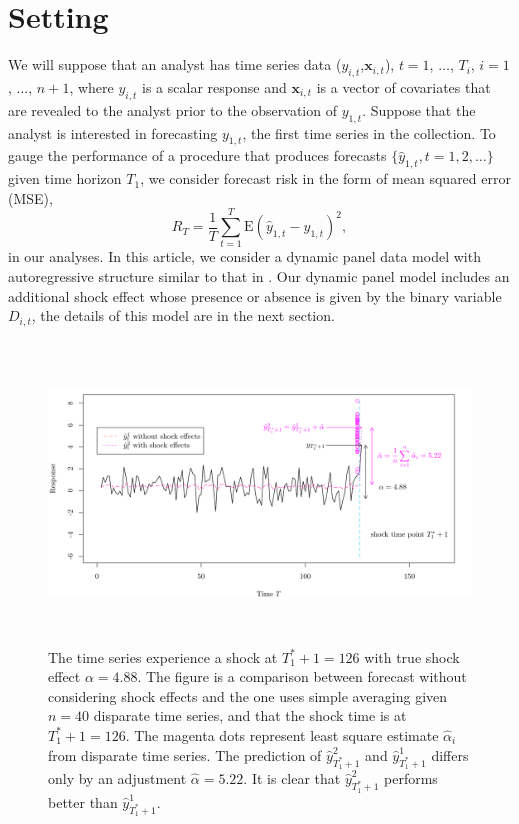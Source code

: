 \documentclass[11pt]{article}
\newcommand{\x}{\textbf{x}}
\def\E#1{\mathrm{E}(#1)} %
\theoremstyle{definition}
\begin{document}
\section{Setting}
\label{setting}



We will suppose that an analyst has time series data ($y_{i,t}$,$\x_{i,t}$), 
$t = 1$, $\ldots$, $T_i$, $i = 1$, $\ldots$, $n+1$, where $y_{i,t}$ is a 
scalar response and $\x_{i,t}$ is a vector of covariates that are revealed to 
the analyst prior to the observation of $y_{1,t}$.  Suppose that the analyst 
is interested in forecasting $y_{1,t}$, the first time series in the 
collection.
To gauge the performance of a procedure that produces forecasts 
$\{\hat y_{1,t}, t= 1,2,\ldots\}$ given time horizon $T_1$, 
we consider forecast risk in the form of  mean squared error (MSE),
$$
  R_T = \frac{1}{T}\sum_{t=1}^T\E{\hat y_{1,t} - y_{1,t}}^2,
$$
in our analyses. In this article, we consider a dynamic panel data 
model with autoregressive structure similar to that in \citet{blundell1998initial}. 
Our dynamic panel model includes an additional shock effect whose presence 
or absence is given by the binary variable $D_{i,t}$, the details of this model 
are in the next section.


\begin{figure}
  \begin{center}
    \includegraphics[height = 8cm]{comp.pdf}
    \caption{The time series experience a shock at $T_1^*+1=126$ with true shock effect $\alpha = 4.88$. The figure is a comparison between forecast without considering shock effects and the one uses simple averaging given $n=40$ disparate time series, and that the shock time is at $T_1^* +1=126$. The magenta dots represent least square estimate $\hat{\alpha}_i$ from disparate time series. The prediction of $\hat{y}^{2}_{T_1^*+1}$ and $\hat{y}^{1}_{T_1^*+1}$ differs only by an adjustment $\hat{\alpha}=5.22$. It is clear that $\hat{y}^{2}_{T_1^*+1}$ performs better than $\hat{y}^{1}_{T_1^*+1}$.}\label{figure1}
  \end{center}  
  \vspace{-.6cm}
\end{figure}
\end{document}
